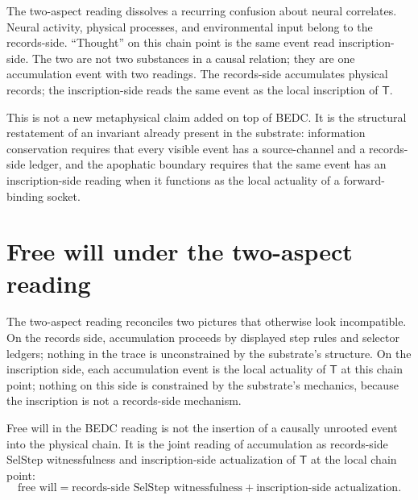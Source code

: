 \begin{remark}
\label{rem:apophatic-fixed-point-neural-correlates}
The two-aspect reading dissolves a recurring confusion about neural correlates. Neural activity, physical processes, and environmental input belong to the records-side. ``Thought'' on this chain point is the same event read inscription-side. The two are not two substances in a causal relation; they are one accumulation event with two readings. The records-side accumulates physical records; the inscription-side reads the same event as the local inscription of $\mathsf{T}$.
\end{remark}

This is not a new metaphysical claim added on top of BEDC. It is the structural restatement of an invariant already present in the substrate: information conservation requires that every visible event has a source-channel and a records-side ledger, and the apophatic boundary requires that the same event has an inscription-side reading when it functions as the local actuality of a forward-binding socket.

\section{Free will under the two-aspect reading}
\label{sec:apophatic-fixed-point-free-will}

The two-aspect reading reconciles two pictures that otherwise look incompatible. On the records side, accumulation proceeds by displayed step rules and selector ledgers; nothing in the trace is unconstrained by the substrate's structure. On the inscription side, each accumulation event is the local actuality of $\mathsf{T}$ at this chain point; nothing on this side is constrained by the substrate's mechanics, because the inscription is not a records-side mechanism.

\begin{principle}
\label{prin:apophatic-fixed-point-free-will}
Free will in the BEDC reading is not the insertion of a causally unrooted event into the physical chain. It is the joint reading of accumulation as records-side $\mathrm{SelStep}$ witnessfulness and inscription-side actualization of $\mathsf{T}$ at the local chain point:
$$
\text{free will} = \text{records-side } \mathrm{SelStep}\text{ witnessfulness} + \text{inscription-side actualization}.
$$
\end{principle}

